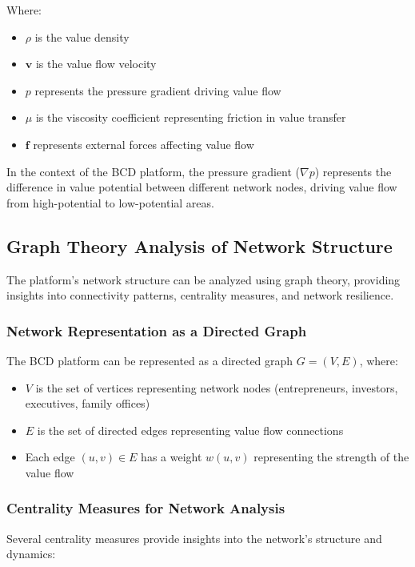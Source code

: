 Where:
\begin{itemize}
    \item $\rho$ is the value density
    \item $\mathbf{v}$ is the value flow velocity
    \item $p$ represents the pressure gradient driving value flow
    \item $\mu$ is the viscosity coefficient representing friction in value transfer
    \item $\mathbf{f}$ represents external forces affecting value flow
\end{itemize}

In the context of the BCD platform, the pressure gradient ($\nabla p$) represents the difference in value potential between different network nodes, driving value flow from high-potential to low-potential areas.

\subsection{Graph Theory Analysis of Network Structure}

The platform's network structure can be analyzed using graph theory, providing insights into connectivity patterns, centrality measures, and network resilience.

\subsubsection{Network Representation as a Directed Graph}

The BCD platform can be represented as a directed graph $G = (V, E)$, where:
\begin{itemize}
    \item $V$ is the set of vertices representing network nodes (entrepreneurs, investors, executives, family offices)
    \item $E$ is the set of directed edges representing value flow connections
    \item Each edge $(u, v) \in E$ has a weight $w(u, v)$ representing the strength of the value flow
\end{itemize}

\subsubsection{Centrality Measures for Network Analysis}

Several centrality measures provide insights into the network's structure and dynamics:

